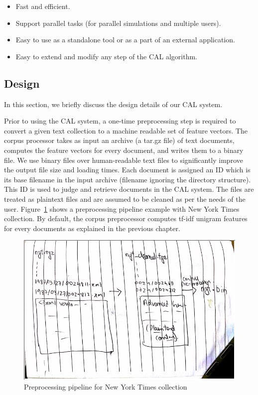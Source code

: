 \begin{itemize}
\item Fast and efficient.
\item Support parallel tasks (for parallel simulations and multiple users).
\item Easy to use as a standalone tool or as a part of an external application.
\item Easy to extend and modify any step of the CAL algorithm.
\end{itemize}

\subsection{Design}
In this section, we briefly discuss the design details of our CAL system.

Prior to using the CAL system, a one-time preprocessing step is required to convert a
given text collection to a machine readable set of feature vectors. The corpus
processor takes as input an archive (a tar.gz file) of text documents, computes
the feature vectors for every document, and writes them to a binary file. We use
binary files over human-readable text files to significantly improve the output
file size and loading times. 
Each document is assigned an ID which is its base filename in the input archive
(filename ignoring the directory structure). This ID is used to judge and
retrieve documents in the CAL system. The files are treated as plaintext files
and are assumed to be cleaned as per the needs of the user.
Figure~\ref{fig:preprocessing} shows a preprocessing pipeline example with New
York Times collection.  By default, the corpus preprocessor computes tf-idf
unigram features for every documents as explained in the previous chapter.

\begin{figure}[h]
\includegraphics[width=\textwidth]{tmp_pictures/preprocessing_pipeline.png}
\caption{Preprocessing pipeline for New York Times collection}
\label{fig:preprocessing}
\end{figure}

